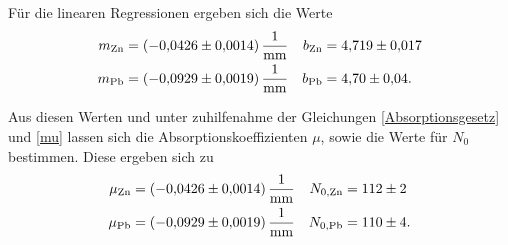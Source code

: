   Für die linearen Regressionen ergeben sich die Werte
  \begin{align*}
      m_{\text{Zn}} & = \qty{-0.0426+-0.0014}{\per\milli\metre} & b_{\text{Zn}} &= \num{4.719+-0.017} \\
      m_{\text{Pb}} & = \qty{-0.0929+-0.0019}{\per\milli\metre} & b_{\text{Pb}} &= \num{4.70+-0.04}. \\
  \end{align*}

  Aus diesen Werten und unter zuhilfenahme der Gleichungen \eqref{Absorptionsgesetz} und \eqref{mu} lassen sich die
  Absorptionskoeffizienten $\mu$, sowie die Werte für $N_0$ bestimmen. Diese ergeben sich zu
  \begin{align*}
    \mu_{\text{Zn}} & = \qty{-0.0426+-0.0014}{\per\milli\metre} & N_{0,\text{Zn}} &= \num{112+-2} \\
    \mu_{\text{Pb}} & = \qty{-0.0929+-0.0019}{\per\milli\metre} & N_{0,\text{Pb}} &= \num{110+-4}. \\
  \end{align*}